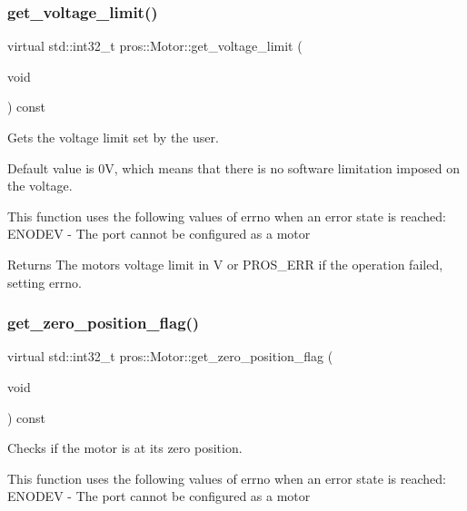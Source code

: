 \subsubsection{\texorpdfstring{get\+\_\+voltage\+\_\+limit()}{get\_voltage\_limit()}}
{\footnotesize\ttfamily virtual std\+::int32\+\_\+t pros\+::\+Motor\+::get\+\_\+voltage\+\_\+limit (\begin{DoxyParamCaption}\item[{void}]{ }\end{DoxyParamCaption}) const\hspace{0.3cm}{\ttfamily [virtual]}}

Gets the voltage limit set by the user.

Default value is 0V, which means that there is no software limitation imposed on the voltage.

This function uses the following values of errno when an error state is reached\+: E\+N\+O\+D\+EV -\/ The port cannot be configured as a motor

\begin{DoxyReturn}{Returns}
The motor\textquotesingle{}s voltage limit in V or P\+R\+O\+S\+\_\+\+E\+RR if the operation failed, setting errno. 
\end{DoxyReturn}
\mbox{\label{classpros_1_1Motor_a589a3cbb397ba065c30c1f16bb3f08a7}} 
\subsubsection{\texorpdfstring{get\+\_\+zero\+\_\+position\+\_\+flag()}{get\_zero\_position\_flag()}}
{\footnotesize\ttfamily virtual std\+::int32\+\_\+t pros\+::\+Motor\+::get\+\_\+zero\+\_\+position\+\_\+flag (\begin{DoxyParamCaption}\item[{void}]{ }\end{DoxyParamCaption}) const\hspace{0.3cm}{\ttfamily [virtual]}}

Checks if the motor is at its zero position.

This function uses the following values of errno when an error state is reached\+: E\+N\+O\+D\+EV -\/ The port cannot be configured as a motor

